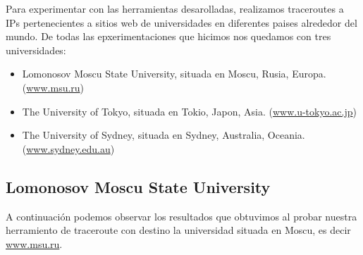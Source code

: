 Para experimentar con las herramientas desarolladas, realizamos traceroutes a IPs pertenecientes a sitios web de universidades en diferentes paises alrededor del mundo. De todas las epxerimentaciones que hicimos nos quedamos con tres universidades:
\begin{itemize}
  \item Lomonosov Moscu State University, situada en Moscu, Rusia, Europa. (\url{www.msu.ru})
  \item The University of Tokyo, situada en Tokio, Japon, Asia. (\url{www.u-tokyo.ac.jp})
  \item The University of Sydney, situada en Sydney, Australia, Oceania. (\url{www.sydney.edu.au})
\end{itemize}

\subsection{Lomonosov Moscu State University}
A continuación podemos observar los resultados que obtuvimos al probar nuestra herramiento de traceroute
con destino la universidad situada en Moscu, es decir \url{www.msu.ru}.

